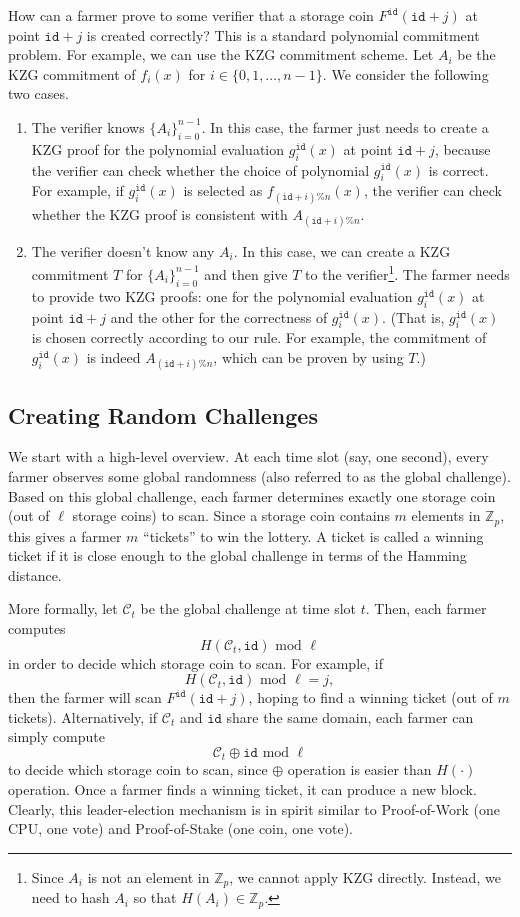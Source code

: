 \documentclass[12pt,draftcls,onecolumn]{IEEEtran}
\newcommand{\Fp}{\mathbb{Z}_p}
\newcommand{\id}{\texttt{id}}
\begin{document}
How can a farmer prove to some verifier that a storage coin $F^{\id}(\id + j)$ at point $\id + j$ is created correctly? This is a standard polynomial commitment problem. For example, we can use the
KZG commitment scheme. Let $A_i$ be the KZG commitment of $f_i(x)$ for $i \in \{0, 1, \ldots, n-1\}$. 
We consider the following two cases.
\begin{enumerate}
    \item The verifier knows $\{ A_i \}_{i = 0}^{n - 1}$. In this case, the farmer just needs to create a KZG proof for the polynomial evaluation $g_i^{\id}(x)$ at point $\id + j$, because the verifier can check whether the choice of polynomial $g_i^{\id}(x)$ is correct. For example, if $g_i^{\id}(x)$ is selected as $f_{(\id + i)\% n}(x)$, the verifier can check whether the KZG proof is consistent with $A_{(\id + i)\% n}$. 
    \item The verifier doesn't know any $A_i$. In this case, we can create a KZG commitment $T$ for $\{ A_i \}_{i = 0}^{n - 1}$ and then give $T$ to the verifier\footnote{Since $A_i$ is not an element in $\Fp$, we cannot apply KZG directly. Instead, we need to hash $A_i$ so that $H(A_i) \in \Fp$.}.  The farmer needs to provide two KZG proofs: one for the polynomial evaluation $g_i^{\id}(x)$ at point $\id + j$ and the other for the correctness of $g_i^{\id}(x)$. (That is, $g_i^{\id}(x)$ is chosen correctly according to our rule. For example, the commitment of $g_i^{\id}(x)$ is indeed $A_{(\id + i)\% n}$, which can be proven by using $T$.)
\end{enumerate}

\subsection{Creating Random Challenges}

We start with a high-level overview. At each time slot (say, one second), every farmer observes some global randomness (also referred to as the global challenge). 
Based on this global challenge, each farmer determines exactly one storage coin (out of $\ell$ storage coins) to scan. Since a storage coin contains $m$ elements in $\Fp$, this gives a farmer $m$ ``tickets'' to win the lottery. A ticket is called a winning ticket if it is close enough to the global challenge in terms of the Hamming distance.

More formally, let $\mathcal{C}_t$ be the global challenge at time slot $t$. Then, each farmer computes
\[
H(\mathcal{C}_t, \id) \mbox{ mod } \ell
\]
in order to decide which storage coin to scan.
For example, if 
\[
H(\mathcal{C}_t, \id) \mbox{ mod } \ell = j,
\]
then the farmer will scan $F^{\id}(\id + j)$, hoping to find a winning ticket (out of $m$ tickets). 
Alternatively, if $\mathcal{C}_t$ and $\id$ share the same domain, each farmer can simply compute
\[
\mathcal{C}_t \oplus \id \mbox{ mod } \ell
\]
to decide which storage coin to scan, since $\oplus$ operation is easier than $H(\cdot)$ operation. 
Once a farmer finds a winning ticket, it can produce a new block.
Clearly, this leader-election mechanism is in spirit similar to Proof-of-Work (one CPU, one vote) and Proof-of-Stake (one coin, one vote).
\end{document}
